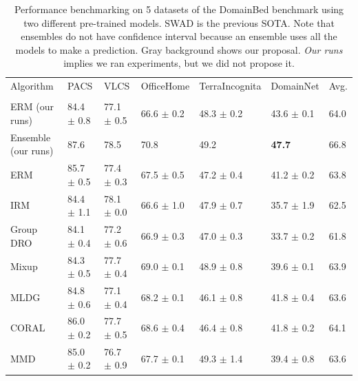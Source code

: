 \begin{table}[]
\small
\centering
\caption{Performance benchmarking on 5 datasets of the DomainBed benchmark using two different pre-trained models. SWAD is the previous SOTA. Note that ensembles do not have confidence interval because an ensemble uses all the models to make a prediction. Gray background shows our proposal. \textit{Our runs} implies we ran experiments, but we did not propose it.}
\begin{tabular}{llllll|l}
\hline
{Algorithm}          & {PACS}           & {VLCS}           & {OfficeHome}     & {TerraIncognita} & {DomainNet}      & {Avg}. \\ \hhline{======|=}
\multicolumn{7}{c}{{ResNet-50 (25M Parameters, pre-trained on ImageNet)}}\\
\hline
ERM (our runs) & 84.4 $\pm$ 0.8 & 77.1 $\pm$ 0.5 & 66.6 $\pm$ 0.2 & 48.3 $\pm$ 0.2 & 43.6 $\pm$ 0.1 & 64.0 \\
Ensemble (our runs) & 87.6             & 78.5           &       70.8         & 49.2           &          \textbf{47.7}      &   66.8   \\
ERM \cite{gulrajani2020search} & 85.7 $\pm$ 0.5 & 77.4 $\pm$ 0.3 & 67.5 $\pm$ 0.5 & 47.2 $\pm$ 0.4 & 41.2 $\pm$ 0.2 & 63.8\\ 
IRM \cite{arjovsky2019invariant}  & 84.4 $\pm$ 1.1            & 78.1 $\pm$ 0.0            & 66.6 $\pm$ 1.0            & 47.9 $\pm$ 0.7            & 35.7 $\pm$ 1.9 & 62.5\\
Group DRO \cite{sagawa2019distributionally}   & 84.1 $\pm$ 0.4            & 77.2 $\pm$ 0.6            & 66.9 $\pm$ 0.3            & 47.0 $\pm$ 0.3            & 33.7 $\pm$ 0.2 & 61.8\\
Mixup \cite{xu2020adversarial,wang2020heterogeneous}   & 84.3 $\pm$ 0.5            & 77.7 $\pm$ 0.4            & 69.0 $\pm$ 0.1            & 48.9 $\pm$ 0.8            & 39.6 $\pm$ 0.1 & 63.9\\
MLDG  \cite{li2018learning}    & 84.8 $\pm$ 0.6            & 77.1 $\pm$ 0.4            & 68.2 $\pm$ 0.1            & 46.1 $\pm$ 0.8            & 41.8 $\pm$ 0.4 & 63.6\\
CORAL  \cite{sun2016deep}   & 86.0 $\pm$ 0.2            & 77.7 $\pm$ 0.5            & 68.6 $\pm$ 0.4            & 46.4 $\pm$ 0.8            & 41.8 $\pm$ 0.2 & 64.1\\
MMD   \cite{li2018domain}  & 85.0 $\pm$ 0.2            & 76.7 $\pm$ 0.9            & 67.7 $\pm$ 0.1            & 49.3 $\pm$ 1.4            & 39.4 $\pm$ 0.8 & 63.6\\

\end{tabular}
\end{table}
